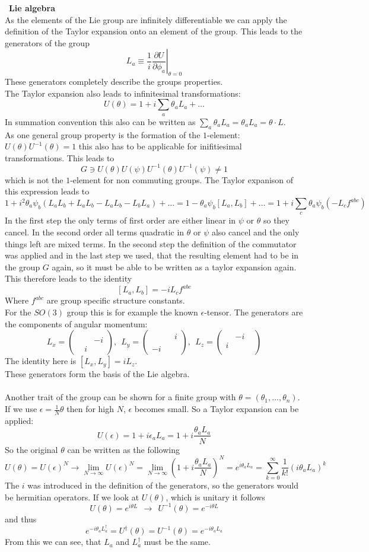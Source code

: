 \documentclass{include/thesisclass}
\newcommand{\cc}{\cdot}
\newcommand{\df}{\rightarrow}
\newcommand{\p}{\partial}
\newcommand{\eps}{\epsilon}
\newcommand{\Mat}[9]{\begin{pmatrix}#1&#2&#3\\#4&#5&#6\\#7&#8&#9\end{pmatrix}}
\newcommand{\sub}[1]{~\newline\newline\textbf{#1}\\}
\begin{document}
\sub{Lie algebra}
As the elements of the Lie group are infinitely differentiable we can apply the definition of the Taylor expansion onto an element of the group. This leads to the generators of the group
\[L_a \equiv \frac{1}{i} \left.\frac{\p U}{\p \phi_a} \right|_{\theta = 0}\]
These generators completely describe the groups properties.\\
The Taylor expansion also leads to infinitesimal transformations:
\[ U(\theta) = 1 + i \sum_a \theta_a L_a + \ldots\]
In summation convention this also can be written as $\sum_a \theta_a L_a = \theta_a L_a = \theta\cc L$.\\
As one general group property is the formation of the $1$-element: $U(\theta)U^{-1}(\theta) = 1$ this also has to be applicable for inifitiesimal transformations. This leads to
\[ G \ni U(\theta)U(\psi)U^{-1}(\theta)U^{-1}(\psi) \neq 1\]
which is not the $1$-element for non commuting groups. The Taylor expanison of this expression leads to
\[ 1 + i^2 \theta_a\psi_b ( L_aL_b + L_aL_b - L_aL_b - L_bL_a) + \ldots = 1 - \theta_a \psi_b [L_a, L_b]+\ldots = 1 + i \sum_c \theta_a \psi_b ( - L_c f^{abc})\]
In the first step the only terms of first order are either linear in $\psi$ or $\theta$ so they cancel. In the second order all terms quadratic in $\theta$ or $\psi$ also cancel and the only things left are mixed terms. In the second step the definition of the commutator was applied and in the last step we used, that the resulting element had to be in the group $G$ again, so it must be able to be written as a taylor expansion again. This therefore leads to the identity
\[ [ L_a, L_b] = -i L_c f^{abc}\]
Where $f^{abc}$ are group specific structure constants.\\
For the $SO(3)$ group this is for example the known $\eps$-tensor. The generators are the components of angular momentum:
\[L_x = \Mat{}{}{}{}{}{-i}{}{i}{}, ~~ L_y = \Mat{}{}{i}{}{}{}{-i}{}{}, ~~L_z = \Mat{}{-i}{}{i}{}{}{}{}{}\]
The identity here is $[L_x,L_y] = iL_z$.\\
These generators form the basis of the Lie algebra.\\
\\
Another trait of the group can be shown for a finite group with $\theta = (\theta_1, \ldots, \theta_n)$. If we use $\eps = \frac{1}{N}\theta$ then for high $N$, $\eps$ becomes small. So a Taylor expansion can be applied:
\[ U(\eps) = 1 + i \eps_a L_a = 1 + i \frac{\theta_a L_a}{N}\]
So the original $\theta$ can be written as the following
\[ U(\theta) = U(\eps)^N \df \lim_{N \df \infty} U(\eps) ^N = \lim_{N\df\infty} \left( 1 + i \frac{\theta_aL_a}{N}\right)^N = e^{i\theta_aL_a} = \sum_{k = 0}^{\infty}\frac{1}{k!}(i\theta_aL_a)^k\]
The $i$ was introduced in the definition of the generators, so the generators would be hermitian operators. If we look at $U(\theta)$, which is unitary it follows
\[ U(\theta) = e^{i\theta L} ~~\df~~ U^{-1}(\theta) = e^{-i\theta L}\]
and thus
\[ e^{-i\theta_aL_a^\dagger} = U^\dagger(\theta) = U^{-1}(\theta) = e^{-i\theta_aL_a}\]
From this we can see, that $L_a$ and $L_a^\dagger$ must be the same.
\end{document}
